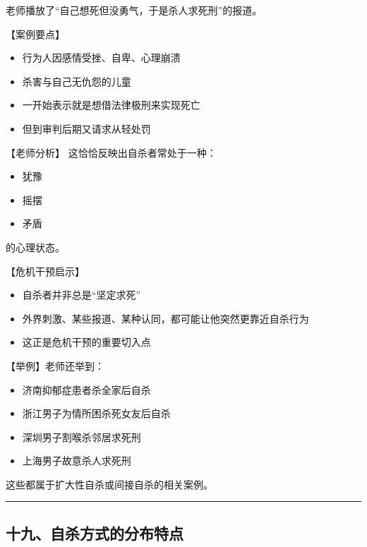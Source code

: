 \documentclass[
  chinese,
  9pt,
  a4paper,
]{ctexart}
\providecommand{\tightlist}{%
  \setlength{\itemsep}{0pt}\setlength{\parskip}{0pt}}
\begin{document}
老师播放了``自己想死但没勇气，于是杀人求死刑''的报道。

【案例要点】

\begin{itemize}
\tightlist
\item
  行为人因感情受挫、自卑、心理崩溃
\item
  杀害与自己无仇怨的儿童
\item
  一开始表示就是想借法律极刑来实现死亡
\item
  但到审判后期又请求从轻处罚
\end{itemize}

【老师分析】 这恰恰反映出自杀者常处于一种：

\begin{itemize}
\tightlist
\item
  犹豫
\item
  摇摆
\item
  矛盾
\end{itemize}

的心理状态。

【危机干预启示】

\begin{itemize}
\tightlist
\item
  自杀者并非总是``坚定求死''
\item
  外界刺激、某些报道、某种认同，都可能让他突然更靠近自杀行为
\item
  这正是危机干预的重要切入点
\end{itemize}

【举例】老师还举到：

\begin{itemize}
\tightlist
\item
  济南抑郁症患者杀全家后自杀
\item
  浙江男子为情所困杀死女友后自杀
\item
  深圳男子割喉杀邻居求死刑
\item
  上海男子故意杀人求死刑
\end{itemize}

这些都属于扩大性自杀或间接自杀的相关案例。

\begin{center}\rule{0.5\linewidth}{0.5pt}\end{center}

\subsection{十九、自杀方式的分布特点}\label{ux5341ux4e5dux81eaux6740ux65b9ux5f0fux7684ux5206ux5e03ux7279ux70b9}
\end{document}
